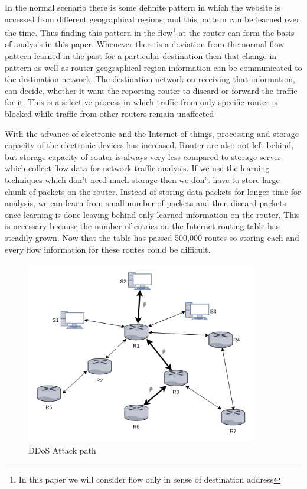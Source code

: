 \documentclass[10pt,oneside,a4paper]{article}
\begin{document}
In the normal scenario there is some definite pattern in which the website is accessed from different geographical regions, and this pattern can be learned over the time. Thus finding this pattern in the flow\footnote{In this paper we will consider flow only in sense of destination address} at the router can form the basis of analysis in this paper. Whenever there is a deviation from the normal flow pattern learned in the past for a particular destination then that change in pattern as well as router geographical region information can be communicated to the destination network. The destination network on receiving that information, can decide, whether it want the reporting router to discard or forward the traffic for it. This is a selective process in which traffic from only specific router is blocked while traffic from other routers remain unaffected\par

With the advance of electronic and the Internet of things, processing and storage capacity of the electronic devices has increased. Router are also not left behind, but storage capacity of router is always very less compared to storage server which collect flow data for network traffic analysis. If we use the learning techniques which don't need much storage then we don't have to store large chunk of packets on the router. Instead of storing data packets for longer time for analysis, we can learn from small number of packets and then discard packets once learning is done leaving behind only learned information on the router. This is necessary because the number of entries on the Internet routing table has steadily grown. Now that the table has passed 500,000 routes\cite{routingtablesize} so storing each and every flow information for these routes could be difficult.\par

\begin{figure}[H]
\centering
\includegraphics[width=0.90\textwidth]{RouterCommunication.png}
\caption{DDoS Attack path} \label{fig:attackpath}
\end{figure}
\end{document}
